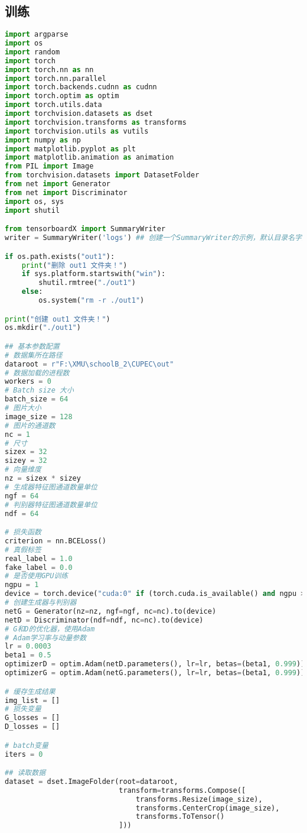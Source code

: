 \documentclass{report}
\begin{document}
\subsection{训练}
\begin{lstlisting}[language=Python, caption=训练, label=code:discriminator]
import argparse
import os
import random
import torch
import torch.nn as nn
import torch.nn.parallel
import torch.backends.cudnn as cudnn
import torch.optim as optim
import torch.utils.data
import torchvision.datasets as dset
import torchvision.transforms as transforms
import torchvision.utils as vutils
import numpy as np
import matplotlib.pyplot as plt
import matplotlib.animation as animation
from PIL import Image
from torchvision.datasets import DatasetFolder
from net import Generator
from net import Discriminator 
import os, sys
import shutil   

from tensorboardX import SummaryWriter
writer = SummaryWriter('logs') ## 创建一个SummaryWriter的示例，默认目录名字为runs

if os.path.exists("out1"):
    print("删除 out1 文件夹！")
    if sys.platform.startswith("win"):
        shutil.rmtree("./out1")
    else:
        os.system("rm -r ./out1")

print("创建 out1 文件夹！")
os.mkdir("./out1")

## 基本参数配置
# 数据集所在路径
dataroot = r"F:\XMU\schoolB_2\CUPEC\out"
# 数据加载的进程数
workers = 0
# Batch size 大小
batch_size = 64
# 图片大小
image_size = 128
# 图片的通道数
nc = 1
# 尺寸
sizex = 32
sizey = 32
# 向量维度
nz = sizex * sizey
# 生成器特征图通道数量单位
ngf = 64
# 判别器特征图通道数量单位
ndf = 64

# 损失函数
criterion = nn.BCELoss()
# 真假标签
real_label = 1.0
fake_label = 0.0
# 是否使用GPU训练
ngpu = 1
device = torch.device("cuda:0" if (torch.cuda.is_available() and ngpu > 0) else "cpu")
# 创建生成器与判别器
netG = Generator(nz=nz, ngf=ngf, nc=nc).to(device)
netD = Discriminator(ndf=ndf, nc=nc).to(device)
# G和D的优化器，使用Adam
# Adam学习率与动量参数
lr = 0.0003
beta1 = 0.5
optimizerD = optim.Adam(netD.parameters(), lr=lr, betas=(beta1, 0.999))
optimizerG = optim.Adam(netG.parameters(), lr=lr, betas=(beta1, 0.999))

# 缓存生成结果
img_list = []
# 损失变量
G_losses = []
D_losses = []

# batch变量
iters = 0

## 读取数据
dataset = dset.ImageFolder(root=dataroot,
                           transform=transforms.Compose([
                               transforms.Resize(image_size),
                               transforms.CenterCrop(image_size),
                               transforms.ToTensor()
                           ]))


\end{lstlisting}
\end{document}
